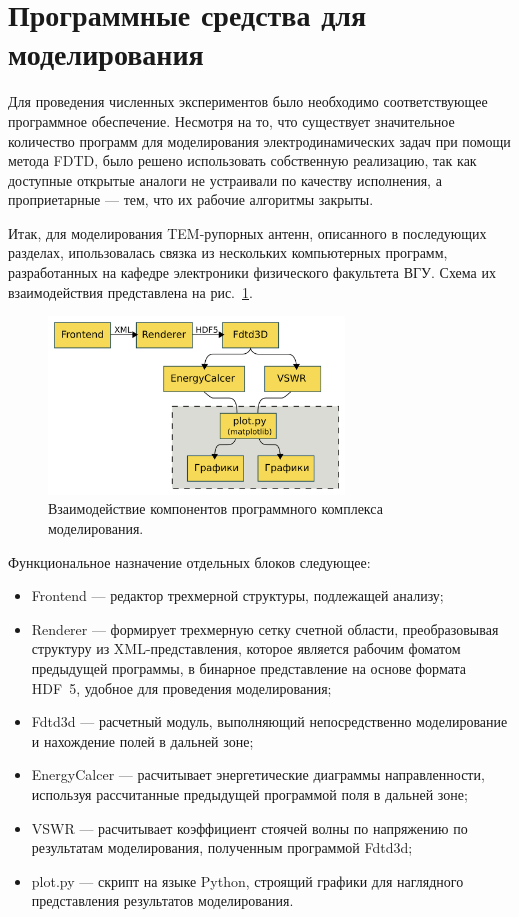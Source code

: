 
\section{Программные средства для моделирования}

Для проведения численных экспериментов было необходимо соответствующее
программное обеспечение. Несмотря на то, что существует значительное количество
программ для моделирования электродинамических задач при помощи метода FDTD,
было решено использовать собственную реализацию, так как доступные открытые
аналоги не устраивали по качеству исполнения, а проприетарные --- тем, что
их рабочие алгоритмы закрыты.

Итак, для моделирования TEM-рупорных антенн, описанного в последующих разделах,
ипользовалась связка из нескольких компьютерных программ, разработанных на
кафедре электроники физического факультета ВГУ. Схема их взаимодействия
представлена на рис.~\ref{fig:Programs:WorkFlow}.

\begin{figure}
\centering
\includegraphics[width=0.7\textwidth]{graphics/programs-work-flow}
\caption{Взаимодействие компонентов программного комплекса моделирования.}
\label{fig:Programs:WorkFlow}
\end{figure}

Функциональное назначение отдельных блоков следующее:
\begin{itemize}
\item Frontend --- редактор трехмерной структуры, подлежащей анализу;
\item Renderer --- формирует трехмерную сетку счетной области, преобразовывая
      структуру из XML-представления, которое является рабочим фоматом
      предыдущей программы, в бинарное представление на основе формата HDF~5,
      удобное для проведения моделирования;
\item Fdtd3d --- расчетный модуль, выполняющий непосредственно моделирование
      и нахождение полей в дальней зоне;
\item EnergyCalcer --- расчитывает энергетические диаграммы направленности,
      используя рассчитанные предыдущей программой поля в дальней зоне;
\item VSWR --- расчитывает коэффициент стоячей волны по напряжению по
      результатам моделирования, полученным программой Fdtd3d;
\item plot.py --- скрипт на языке Python, строящий графики для наглядного
      представления результатов моделирования.
\end{itemize}

